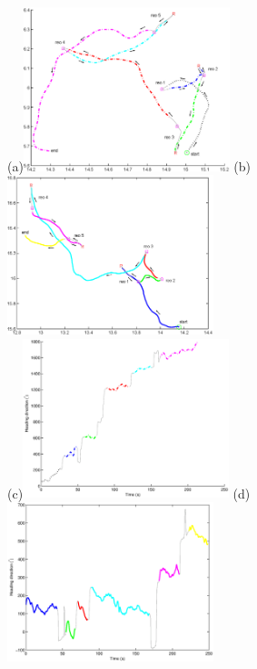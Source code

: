 \documentclass[12pt]{article}
\begin{document}

\begin{figure}
  (a)\includegraphics[width=6cm]{track2.eps}
  (b)\includegraphics[width=6cm]{track4.eps}\\[1cm]
  (c)\includegraphics[width=6cm]{track2_dir.eps}
  (d)\includegraphics[width=6cm]{track4_dir.eps}\\[1cm]

\end{figure}
\end{document}

